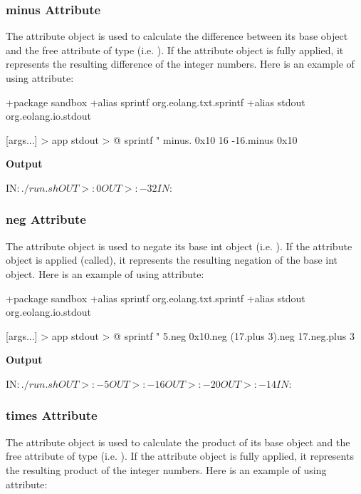\documentclass[12pt]{book}
\begin{document}
{\subsubsection{minus Attribute}
The  attribute object is used to calculate the difference between its base  object and the free attribute  of type  (i.e. ).
If the  attribute object is fully applied, it represents the resulting difference of the integer numbers. Here is an example of using  attribute:

\begin{ffcode}
+package sandbox
+alias sprintf org.eolang.txt.sprintf
+alias stdout org.eolang.io.stdout

[args...] > app
  stdout > @
    sprintf
      "%
      minus.
        0x10
        16
      -16.minus 0x10
\end{ffcode}
\textbf{Output}
\begin{ffcode}
IN$: ./run.sh
OUT>: 0
OUT>: -32
IN$: 
\end{ffcode}

\subsubsection{neg Attribute}
The  attribute object is used to negate its base int object (i.e. \ff{-$}).
If the  attribute object is applied (called), it represents the resulting negation of the base int object. Here is an example of using  attribute:

\begin{ffcode}
+package sandbox
+alias sprintf org.eolang.txt.sprintf
+alias stdout org.eolang.io.stdout

[args...] > app
  stdout > @
    sprintf
      "%
      5.neg
      0x10.neg
      (17.plus 3).neg
      17.neg.plus 3
\end{ffcode}
\textbf{Output}
\begin{ffcode}
IN$: ./run.sh
OUT>: -5
OUT>: -16
OUT>: -20
OUT>: -14
IN$: 
\end{ffcode}

\subsubsection{times Attribute}
The  attribute object is used to calculate the product of its base  object and the free attribute  of type  (i.e. ).
If the  attribute object is fully applied, it represents the resulting product of the integer numbers. Here is an example of using  attribute:

}
\end{document}
